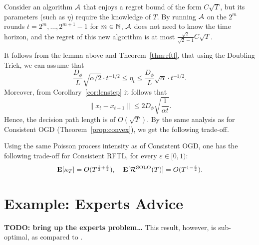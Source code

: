 \begin{lemma}
    Consider an algorithm $\mathcal{A}$ that enjoys a regret bound of the form $C\sqrt{T}$, but its parameters (such as $\eta$) require the knowledge of $T$. By running $\mathcal{A}$ on the $2^m$ rounds $t = 2^m,\ldots,2^{m+1} -1$ for $m\in \mathbb{N}$, $\mathcal{A}$ does not need to know the time horizon, and the regret of this new algorithm is at most $\frac{\sqrt{2}}{\sqrt{2} - 1}C\sqrt{T}$.
\end{lemma}

It follows from the lemma above and Theorem~\ref{thm:rftl}, that using the Doubling Trick, we can assume that 
\[
    \frac{D_\phi}{L} \sqrt{\alpha/2}\cdot t^{-1/2} \leq \eta_t \leq \frac{D_\phi}{L} \sqrt{\alpha} \cdot t^{-1/2}.
\]
Moreover, from Corollary~\ref{cor:lenstep} it follows that 
\[
    \|x_t - x_{t+1}\| \leq  2D_\phi \sqrt{\frac{1}{\alpha t}}.
\]
Hence, the decision path length is of $O(\sqrt{T})$. By the same analysis as for Consistent OGD (Theorem~\ref{prop:convex}), we get the following trade-off.
\begin{theorem}
    Using the same Poisson process intensity as of Consistent OGD, one has the following trade-off for Consistent RFTL, for every $\varepsilon \in [0, 1)$:
   \[
      \mathbf{E}[\kappa_T] = O(T^{\frac{1}{2}+\frac{\varepsilon}{2}}),\quad \mathbf{E}[\mathcal{R}^{\mathrm{SOLO}}(T)] = O(T^{1-\frac{\varepsilon}{2}}).
   \]
 
\end{theorem}

\section{Example: Experts Advice}\label{sec:experts}
\textbf{TODO: bring up the experts problem\dots}
This result, however, is sub-optimal, as compared to \citet{altschuler2018online}.

